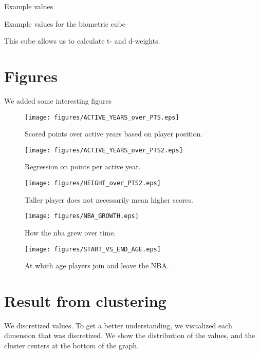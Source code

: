 \documentclass{article}
\begin{document}
Example values

\begin{table}[h]
    \centering
    \begin{adjustbox}{max width=\textwidth}
    
    \end{adjustbox}
    \caption{Example values for the biometric cube}
\end{table}

This cube allows us to calculate t- and d-weights.

\section{Figures}
We added some interesting figures

\begin{figure}[h]
    \centering
    \texttt{[image: figures/ACTIVE\_YEARS\_over\_PTS.eps]}
    \caption{Scored points over active years based on player position.}
\end{figure}

\begin{figure}[h]
    \centering
    \texttt{[image: figures/ACTIVE\_YEARS\_over\_PTS2.eps]}
    \caption{Regression on points per active year.}
\end{figure}

\begin{figure}[h]
    \centering
    \texttt{[image: figures/HEIGHT\_over\_PTS2.eps]}
    \caption{Taller player does not necessarily mean higher scores.}
\end{figure}

\begin{figure}[h]
    \centering
    \texttt{[image: figures/NBA\_GROWTH.eps]}
    \caption{How the nba grew over time.}
\end{figure}

\begin{figure}[h]
    \centering
    \texttt{[image: figures/START\_VS\_END\_AGE.eps]}
    \caption{At which age players join and leave the NBA.}
\end{figure}

\clearpage

\section{Result from clustering}

We discretized values.
To get a better understanding, we visualized each dimension that was discretized.
We show the distribution of the values, and the cluster centers at the bottom of the graph.
\end{document}
